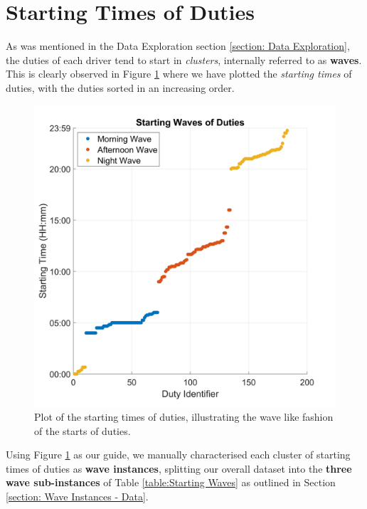 
\section{Starting Times of Duties}
\label{subsection: Appendix Starting times}
As was mentioned in the Data Exploration section \ref{section: Data Exploration}, the duties of each driver tend to start in \textit{clusters}, internally referred to as \textbf{waves}. This is clearly observed in Figure \ref{fig:starting time} where we have plotted the \textit{starting times} of duties, with the duties sorted in an increasing order. 



\begin{figure}[ht]
\begin{center}
\includegraphics[width=0.46\linewidth]{appendix/Appendix-Start-wave.png}
    
\end{center}
   \caption{Plot of the starting times of duties, illustrating the wave like fashion of the starts of duties.}
\label{fig:starting time}
\end{figure}

\vspace{\baselineskip}
\noindent
Using Figure \ref{fig:starting time} as our guide, we manually characterised each cluster of starting times of duties as \textbf{wave instances}, splitting our overall dataset into the \textbf{three wave sub-instances} of Table \ref{table:Starting Waves} as outlined in Section \ref{section: Wave Instances - Data}.  


